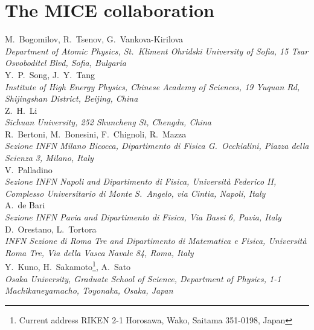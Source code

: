 %

\thispagestyle{plain}
\setlength\parindent{0em}%

\section*{The MICE collaboration}

M.~Bogomilov,  R.~Tsenov, G.~Vankova-Kirilova
\\{\it
Department of Atomic Physics, St.~Kliment Ohridski University of Sofia, 15 Tsar Osvoboditel Blvd, Sofia, Bulgaria
}\\

Y.~P.~Song, J.~Y.~Tang
\\{\it
Institute of High Energy Physics, Chinese Academy of Sciences, 19 Yuquan Rd, Shijingshan District, Beijing, China
}\\

Z.~H.~Li
\\{\it
Sichuan University, 252 Shuncheng St, Chengdu, China
}\\

R.~Bertoni, M.~Bonesini, F.~Chignoli, R.~Mazza
\\{\it
Sezione INFN Milano Bicocca, Dipartimento di Fisica G.~Occhialini, Piazza della Scienza 3, Milano, Italy
}\\


V.~Palladino
\\{\it
Sezione INFN Napoli and Dipartimento di Fisica, Universit\`{a} Federico II, Complesso Universitario di Monte S.~Angelo, via Cintia, Napoli, Italy
}\\

A.~de Bari
\\{\it 
Sezione INFN Pavia and Dipartimento di Fisica, Via Bassi 6, Pavia, Italy
}\\

D.~Orestano, L.~Tortora
\\{\it
INFN Sezione di Roma Tre and Dipartimento di Matematica e Fisica, Universit\`{a} Roma Tre, Via della Vasca Navale 84, Roma, Italy
}\\

Y.~Kuno, H.~Sakamoto\footnote{Current address RIKEN 2-1 Horosawa, Wako, Saitama 351-0198, Japan}, A.~Sato
\\{\it
Osaka University, Graduate School of Science, Department of Physics, 1-1 Machikaneyamacho, Toyonaka, Osaka, Japan
}\\

